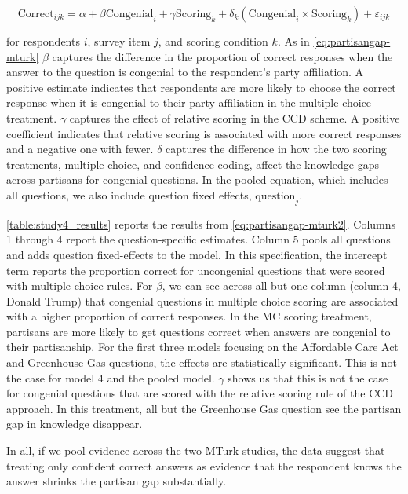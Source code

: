 \documentclass[12pt, letterpaper]{article}
\begin{document}
\begin{equation}\label{eq:partisangap-mturk2}
  \text{Correct}_{ijk} = \alpha + \beta \text{Congenial}_i + \gamma \text{Scoring}_k + \delta_k (\text{Congenial}_i \times \text{Scoring}_k) + \varepsilon_{ijk}
\end{equation}

for respondents \(i\), survey item \(j\), and scoring condition \(k\). As in \cref{eq:partisangap-mturk} \(\beta\) captures the difference in the proportion of correct responses when the answer to the question is congenial to the respondent's party affiliation. A positive estimate indicates that respondents are more likely to choose the correct response when it is congenial to their party affiliation in the multiple choice treatment. \(\gamma\) captures the effect of relative scoring in the CCD scheme. A positive coefficient indicates that relative scoring is associated with more correct responses and a negative one with fewer. \(\delta\) captures the difference in how the two scoring treatments, multiple choice, and confidence coding, affect the knowledge gaps across partisans for congenial questions. In the pooled equation, which includes all questions, we also include question fixed effects, \(\text{question}_j\).

 \cref{table:study4_results} reports the results from \cref{eq:partisangap-mturk2}. Columns 1 through 4 report the question-specific estimates. Column 5 pools all questions and adds question fixed-effects to the model. In this specification, the intercept term reports the proportion correct for uncongenial questions that were scored with multiple choice rules. For \(\beta\), we can see across all but one column (column 4, Donald Trump) that congenial questions in multiple choice scoring are associated with a higher proportion of correct responses. In the MC scoring treatment, partisans are more likely to get questions correct when answers are congenial to their partisanship. For the first three models focusing on the Affordable Care Act and Greenhouse Gas questions, the effects are statistically significant. This is not the case for model 4 and the pooled model. \(\gamma\) shows us that this is not the case for congenial questions that are scored with the relative scoring rule of the CCD approach. In this treatment, all but the Greenhouse Gas question see the partisan gap in knowledge disappear.

 In all, if we pool evidence across the two MTurk studies, the data suggest that treating only confident correct answers as evidence that the respondent knows the answer shrinks the partisan gap substantially. 
\end{document}
